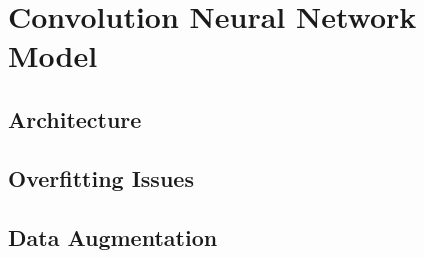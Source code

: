 \chapter{Convolution Neural Network Model}
\label{chap:cnn}

\section{Architecture}

\section{Overfitting Issues}

\section{Data Augmentation}


